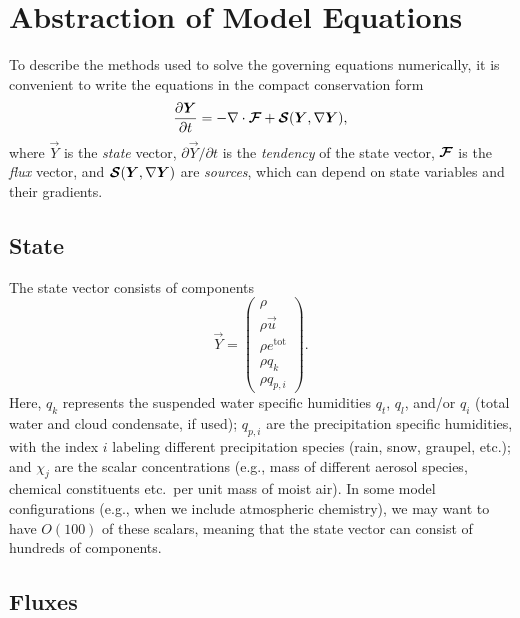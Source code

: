 \documentclass{report}
\begin{document}
\chapter{Abstraction of Model Equations}\label{c:abstract_model_formulation}

To describe the methods used to solve the governing equations numerically, it is convenient to write the equations in the compact conservation form 
\begin{equation}\label{e:eom_compact}
\frac{\partial \boldsymbol{{Y}}}{\partial t}  =  - \nabla \cdot \boldsymbol{{\mathcal{F}}} + \boldsymbol{{\mathcal{S}}}(\boldsymbol{{Y}}, \nabla\boldsymbol{{Y}}),
\end{equation}
where $\vec{Y}$ is the \emph{state} vector, $\partial\vec{Y}/\partial t$ is the \emph{tendency} of the state vector, $\boldsymbol{{\mathcal{F}}}$ is the \emph{flux} vector, and $\boldsymbol{{\mathcal{S}}}(\boldsymbol{{Y}}, \nabla\boldsymbol{{Y}})$ are \emph{sources}, which can depend on state variables and their gradients. 

\section{State}

The state vector consists of components
\begin{equation}\label{e:state}
\vec{Y}=\left( \begin{array}{c}
\rho \\
\rho\vec{u} \\
\rho e^{\mathrm{tot}}\\
\rho q_k\\
\rho q_{p,i}
\end{array}
\right).
\end{equation}
Here, $q_k$ represents the suspended water specific humidities $q_t$, $q_l$, and/or $q_i$ (total water and cloud condensate, if used); $q_{p,i}$ are the precipitation specific humidities, with the index $i$ labeling different precipitation species (rain, snow, graupel, etc.); and $\chi_j$ are the scalar concentrations (e.g., mass of different aerosol species, chemical constituents etc.\ per unit mass of moist air). In some model configurations (e.g., when we include atmospheric chemistry), we may want to have $O(100)$ of these scalars, meaning that the state vector can consist of hundreds of components.

\section{Fluxes}\label{sec:fluxes}
\end{document}

